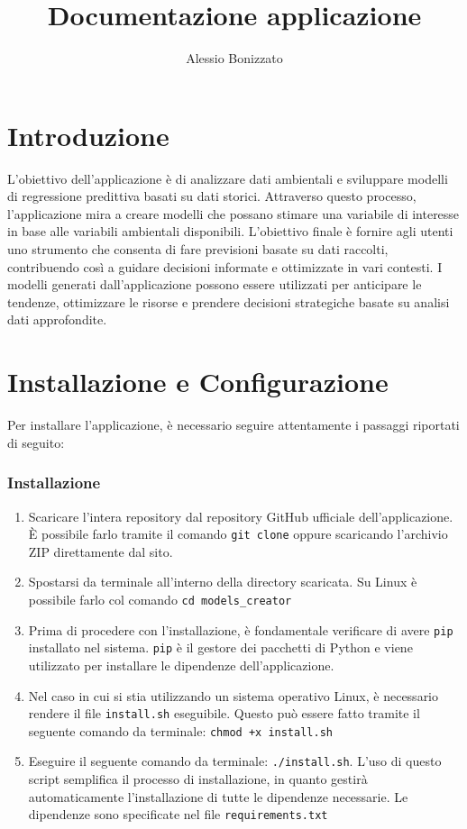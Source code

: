 \documentclass[a4paper,10pt]{article}
\newcommand{\rootDirectory}{models\_creator}
\begin{document}
\title{Documentazione applicazione}
\author{Alessio Bonizzato}
\date{}
\maketitle %

\newpage
\tableofcontents
\newpage
\section{Introduzione}
L'obiettivo dell'applicazione è di analizzare dati ambientali e sviluppare modelli di regressione predittiva basati su dati storici. 
Attraverso questo processo, l'applicazione mira a creare modelli che possano stimare una variabile di interesse in base alle variabili ambientali disponibili. 
L'obiettivo finale è fornire agli utenti uno strumento che consenta di fare previsioni basate su dati raccolti, contribuendo così a guidare decisioni informate 
e ottimizzate in vari contesti. I modelli generati dall'applicazione possono essere utilizzati per anticipare le tendenze, 
ottimizzare le risorse e prendere decisioni strategiche basate su analisi dati approfondite.

\section{Installazione e Configurazione}
Per installare l'applicazione, è necessario seguire attentamente i passaggi riportati di seguito:

\subsubsection*{Installazione}
\begin{enumerate}
  \item Scaricare l'intera repository dal repository GitHub ufficiale dell'applicazione. 
  È possibile farlo tramite il comando \texttt{git clone} oppure scaricando l'archivio ZIP direttamente dal sito.
  \item Spostarsi da terminale all'interno della directory scaricata. Su Linux è possibile farlo col comando \texttt{cd \rootDirectory}
  \item Prima di procedere con l'installazione, è fondamentale verificare di avere \texttt{pip} installato nel sistema. 
  \texttt{pip} è il gestore dei pacchetti di Python e viene utilizzato per installare le dipendenze dell'applicazione.
  \item Nel caso in cui si stia utilizzando un sistema operativo Linux, è necessario rendere il file \texttt{install.sh} eseguibile. 
  Questo può essere fatto tramite il seguente comando da terminale: \texttt{chmod +x install.sh}
  \item Eseguire il seguente comando da terminale: \texttt{./install.sh}. L'uso di questo script semplifica il processo di installazione, 
  in quanto gestirà automaticamente l'installazione di tutte le dipendenze necessarie. Le dipendenze sono specificate nel file \texttt{requirements.txt}
\end{enumerate}
\end{document}
